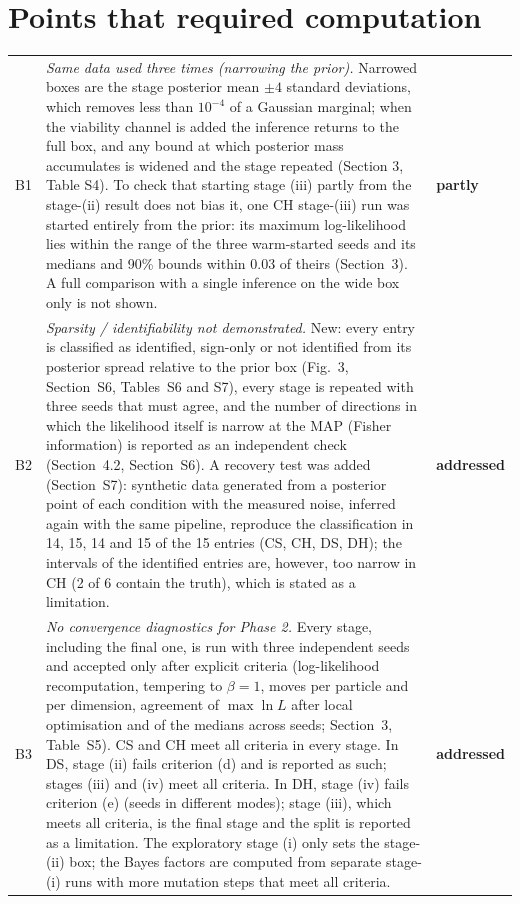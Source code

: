 \documentclass[11pt,a4paper]{article}
\newcommand{\done}{\textcolor{green!45!black}{\textbf{addressed}}}
\newcommand{\partly}{\textcolor{orange!80!black}{\textbf{partly}}}
\begin{document}
\section*{Points that required computation}
\begin{tabularx}{\textwidth}{@{}l Y l@{}}
\toprule
B1 & \emph{Same data used three times (narrowing the prior).} Narrowed boxes are the stage posterior mean $\pm4$ standard deviations, which removes less than $10^{-4}$ of a Gaussian marginal; when the viability channel is added the inference returns to the full box, and any bound at which posterior mass accumulates is widened and the stage repeated (Section 3, Table S4). To check that starting stage (iii) partly from the stage-(ii) result does not bias it, one CH stage-(iii) run was started entirely from the prior: its maximum log-likelihood lies within the range of the three warm-started seeds and its medians and 90\% bounds within 0.03 of theirs (Section~3). A full comparison with a single inference on the wide box only is not shown. & \partly\\
B2 & \emph{Sparsity / identifiability not demonstrated.} New: every entry is classified as identified, sign-only or not identified from its posterior spread relative to the prior box (Fig.~3, Section~S6, Tables~S6 and S7), every stage is repeated with three seeds that must agree, and the number of directions in which the likelihood itself is narrow at the MAP (Fisher information) is reported as an independent check (Section~4.2, Section~S6). A recovery test was added (Section~S7): synthetic data generated from a posterior point of each condition with the measured noise, inferred again with the same pipeline, reproduce the classification in 14, 15, 14 and 15 of the 15 entries (CS, CH, DS, DH); the intervals of the identified entries are, however, too narrow in CH (2 of 6 contain the truth), which is stated as a limitation. & \done\\
B3 & \emph{No convergence diagnostics for Phase 2.} Every stage, including the final one, is run with three independent seeds and accepted only after explicit criteria (log-likelihood recomputation, tempering to $\beta=1$, moves per particle and per dimension, agreement of $\max\ln L$ after local optimisation and of the medians across seeds; Section~3, Table~S5). CS and CH meet all criteria in every stage. In DS, stage (ii) fails criterion (d) and is reported as such; stages (iii) and (iv) meet all criteria. In DH, stage (iv) fails criterion (e) (seeds in different modes); stage (iii), which meets all criteria, is the final stage and the split is reported as a limitation. The exploratory stage (i) only sets the stage-(ii) box; the Bayes factors are computed from separate stage-(i) runs with more mutation steps that meet all criteria. & \done\\

\end{tabularx}
\end{document}
